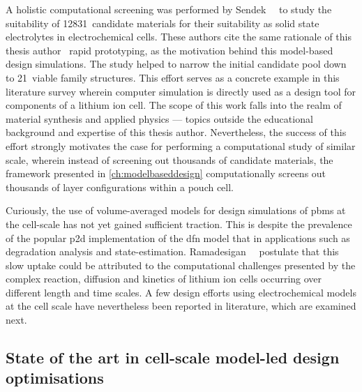 A      holistic      computational      screening     was      performed      by
Sendek~\etal~\cite{Sendek2017}  to  study  the  suitability  of  12831~candidate
materials for their  suitability as solid state  electrolytes in electrochemical
cells. These authors  cite the same rationale of this  thesis author \ie~rapid
prototyping, as the  motivation behind this model-based  design simulations. The
study  helped to  narrow the  initial candidate  pool down  to 21~viable  family
structures. This effort  serves as a concrete example in  this literature survey
wherein computer simulation is directly used  as a design tool for components of
a lithium  ion cell. The  scope of  this work falls  into the realm  of material
synthesis and applied physics ---  topics outside the educational background and
expertise  of this  thesis  author.  Nevertheless, the  success  of this  effort
strongly  motivates the  case for  performing a  computational study  of similar
scale, wherein  instead of screening  out thousands of candidate  materials, the
framework  presented in  \cref{ch:modelbaseddesign} computationally  screens out
thousands of layer configurations within a pouch cell.

Curiously,  the  use  of  volume-averaged   models  for  design  simulations  of
\glspl{pbm} at  the cell-scale has not  yet gained sufficient traction.  This is
despite the prevalence of the  popular \gls{p2d} implementation of the \gls{dfn}
model that  in applications such  as degradation analysis  and state-estimation.
Ramadesigan~\etal~\cite{Ramadesigan2012} postulate  that this slow  uptake could
be attributed to the computational challenges presented by the complex reaction,
diffusion and kinetics of lithium ion  cells occurring over different length and
time scales. A few design efforts using electrochemical models at the cell scale
have nevertheless been reported in literature, which are examined next.

\subsection{State of the art in cell-scale model-led design optimisations}

